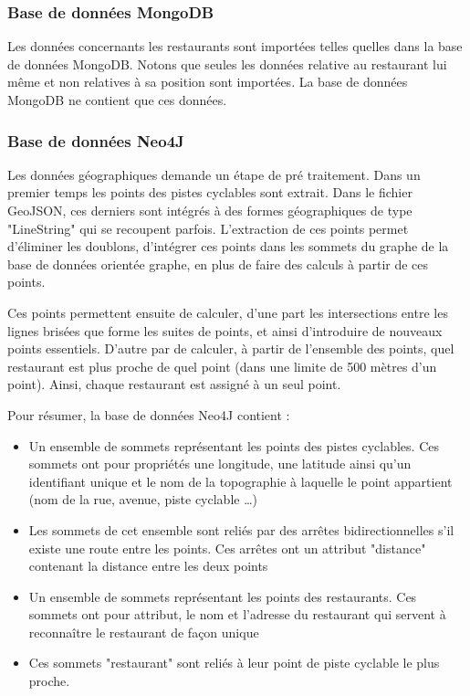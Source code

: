 \documentclass[11pt,a4paper]{article}
\begin{document}
\subsubsection{Base de données MongoDB}

    Les données concernants les restaurants sont importées telles quelles dans la base de données MongoDB. Notons que seules les données relative au restaurant lui même et non relatives à sa position sont importées. La base de données MongoDB ne contient que ces données.

\subsubsection{Base de données Neo4J}

    Les données géographiques demande un étape de pré traitement. Dans un premier temps les points des pistes cyclables sont extrait. Dans le fichier GeoJSON, ces derniers sont intégrés à des formes géographiques de type "LineString" qui se recoupent parfois. L'extraction de ces points permet d'éliminer les doublons, d'intégrer ces points dans les sommets du graphe de la base de données orientée graphe, en plus de faire des calculs à partir de ces points.

    Ces points permettent ensuite de calculer, d'une part les intersections entre les lignes brisées que forme les suites de points, et ainsi d'introduire de nouveaux points essentiels. D'autre par de calculer, à partir de l'ensemble des points, quel restaurant est plus proche de quel point (dans une limite de 500 mètres d'un point). Ainsi, chaque restaurant est assigné à un seul point.
    
    Pour résumer, la base de données Neo4J contient :

    \begin{itemize}
        \item Un ensemble de sommets représentant les points des pistes cyclables. Ces sommets ont pour propriétés une longitude, une latitude ainsi qu'un identifiant unique et le nom de la topographie à laquelle le point appartient (nom de la rue, avenue, piste cyclable \dots)
        \item Les sommets de cet ensemble sont reliés par des arrêtes bidirectionnelles s'il existe une route entre les points. Ces arrêtes ont un attribut "distance" contenant la distance entre les deux points
        \item Un ensemble de sommets représentant les points des restaurants. Ces sommets ont pour attribut, le nom et l'adresse du restaurant qui servent à reconnaître le restaurant de façon unique
        \item Ces sommets "restaurant" sont reliés à leur point de piste cyclable le plus proche.
    \end{itemize}
\end{document}
